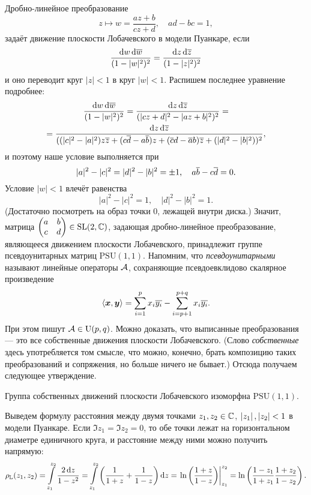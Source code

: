 \noindent
Дробно-линейное преобразование
\[
	z \mapsto w = \frac{az + b}{cz + d},\quad ad - bc = 1,
\]
задаёт движение плоскости Лобачевского в модели Пуанкаре, если
\[
	\frac{\mathop{}\!\mathrm{d} w\mathop{}\!\mathrm{d}\overline{w}}{(1 - |w|^2)^2} = \frac{\mathop{}\!\mathrm{d} z\mathop{}\!\mathrm{d}\overline{z}}{(1 - |z|^2)^2}
\]
и оно переводит круг $|z| < 1$ в круг $|w| < 1$. Распишем последнее уравнение подробнее:
\begin{multline*}
	\frac{\mathop{}\!\mathrm{d} w\mathop{}\!\mathrm{d}\overline{w}}{(1 - |w|^2)^2} = \frac{\mathop{}\!\mathrm{d} z\mathop{}\!\mathrm{d}\overline{z}}{(|cz + d|^2 - |az + b|^2)^2} =\\ = \frac{\mathop{}\!\mathrm{d} z\mathop{}\!\mathrm{d}\overline{z}}{((|c|^2 - |a|^2)z\overline{z} + (c\overline{d} - a\overline{b})z + (\overline{c}d - \overline{a}b)\overline{z} + (|d|^2 - |b|^2))^2},
\end{multline*}
и поэтому наше условие выполняется при
\[
	|a|^2 - |c|^2 = |d|^2 - |b|^2 = \pm 1,\quad a\overline{b} - c\overline{d} = 0.
\]
Условие $|w| < 1$ влечёт равенства
\[
	|a|^2 - |c|^2 = 1,\quad |d|^2 - |b|^2 = 1.
\]
(Достаточно посмотреть на образ точки $0$, лежащей внутри диска.) Значит, матрица
$\begin{pmatrix}
	a & b\\
	c & d
\end{pmatrix} \in \mathrm{SL}(2, \mathbb{C})$, задающая дробно-линейное преобразование, являющееся движением плоскости Лобачевского, принадлежит группе псевдоунитарных матриц $\mathrm{PSU}(1, 1)$. Напомним, что \textit{псевдоунитарными} называют линейные операторы $\mathcal{A}$, сохраняющие псевдоевклидово скалярное произведение
\[
	\langle\boldsymbol{x}, \boldsymbol{y}\rangle = \sum_{i = 1}^px_i\overline{y_i} - \sum_{i = p + 1}^{p + q}x_i\overline{y_i}.
\]
При этом пишут $\mathcal{A} \in \mathrm{U}(p, q)$. Можно доказать, что выписанные преобразования --- это все собственные движения плоскости Лобачевского. (Слово \textit{собственные} здесь употребляется том смысле, что можно, конечно, брать композицию таких преобразований и сопряжения, но больше ничего не бывает.) Отсюда получаем следующее утверждение.

\begin{theorem}
	Группа собственных движений плоскости Лобачевского изоморфна $\mathrm{PSU}(1, 1)$.
\end{theorem}

Выведем формулу расстояния между двумя точками $z_1, z_2 \in \mathbb{C}$, $\left\lvert z_1\right\rvert, \left\lvert z_2\right\rvert < 1$ в модели Пуанкаре. Если $\Im z_1 = \Im z_2 = 0$, то обе точки лежат на горизонтальном диаметре единичного круга, и расстояние между ними можно получить напрямую:
\[
	\rho_{\mathbb{L}}(z_1, z_2) = \int\limits_{z_1}^{z_2}\frac{2\mathop{}\!\mathrm{d} z}{1 - z^2} = \int\limits_{z_1}^{z_2}\left(\frac{1}{1 + z} + \frac{1}{1 - z}\right)\mathop{}\!\mathrm{d} z = \left.\ln\left(\frac{1 + z}{1 - z}\right)\right|_{z_1}^{z_2} = \ln\left(\frac{1 - z_1}{1 + z_1}\frac{1 + z_2}{1 - z_2}\right).
\]

